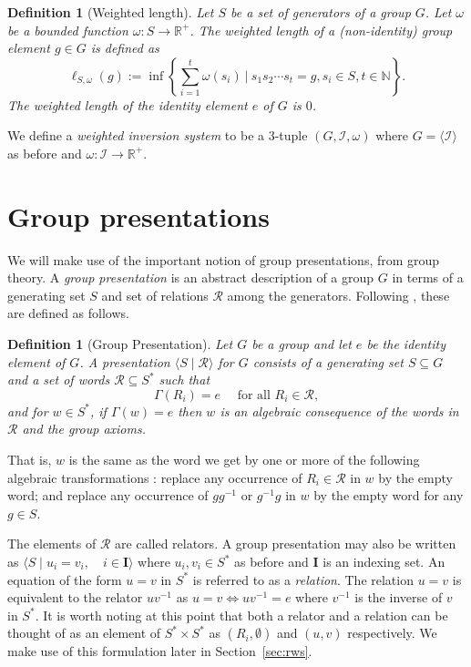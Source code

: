 \documentclass[utf8]{Frontiers_LaTex_Templates/frontiersFPHY} %
\newcommand{\invset}{\mathcal{I}}
\newcommand{\id}{e}
\newcommand{\N}{\mathbb N}
\newcommand{\newl}{\ell}
\numberwithin{equation}{section}
\newtheorem{definition}[prop]{Definition}
\begin{document}
\begin{definition}[Weighted length]
\label{def:wwl}
Let $S$ be a set of generators of a group $G$. Let $\omega$ be a bounded function $\omega:S \rightarrow \mathbb{R}^+$. The weighted length of a (non-identity) group element $g \in G$ is defined as 
\[
\newl_{S,\omega}(g):= 
\inf \left\{ \sum_{i=1}^{t}{\omega(s_i)}\ \Big\vert\  s_1 s_2  \cdots s_t = g, s_i \in S,t\in\N\right\}.
\]
The weighted length of the identity element $e$ of $G$ is $0$. 
\end{definition}

We define a \emph{weighted inversion system} to be a 3-tuple $(G, \invset, \omega)$ where $G = \langle \invset \rangle$ as before and $\omega : \invset \rightarrow \mathbb{R}^+$.  

\section{Group presentations}\label{sec:grppresent}

We will make use of the important notion of group presentations, from group theory. A \emph{group presentation} is an abstract description of a group $G$ in terms of a generating set $S$ and set of relations $\mathcal{R}$ among the generators. Following \citet[Chapter 1]{coxeter1980generators}, these are defined as follows.


\begin{definition}[Group Presentation]
Let $G$ be a group and let $\id$ be the identity element of $G$.
A \emph{presentation} $\langle S \mid \mathcal{R} \rangle$ for $G$ consists of a generating set $S \subseteq G$ and a set of words $\mathcal{R} \subseteq S^*$ such that
\[ \Gamma(R_i) = \id \quad \text{ for all } R_i \in \mathcal{R}, \] 
and for $w \in S^*$, if $\Gamma(w)  = \id$ then $w$ is an \emph{algebraic consequence} of the words in $\mathcal{R}$ and the group axioms.
\end{definition}

That is, $w$ is the same as the word we get by one or more of the following algebraic transformations : replace any occurrence of $R_i \in \mathcal{R}$ in $w$ by the empty word; and replace any occurrence of $gg^{-1}$ or $g^{-1}g$ in $w$ by the empty word for any $g \in S$.

The elements of $\mathcal{R}$ are called relators. A group presentation may also be written as
$\langle S \mid u_i = v_i, \quad i \in \mathbf{I}  \rangle$ where $u_i, v_i \in S^*$ as before and $\mathbf{I}$ is an indexing set. An equation of the form $u = v$ in $S^*$ is referred to as a \emph{relation}. The relation $u = v$ is equivalent to the relator $u v^{-1}$ as $u = v \iff u v^{-1} = \id$ where $v^{-1}$ is the inverse of $v$ in $S^*$.  It is worth noting at this point that both a relator and a relation can be thought of as an element of $S^* \times S^*$ as $(R_i, \emptyset)$ and $(u, v)$ respectively. We make use of this formulation later in Section~\ref{sec:rws}.
\end{document}
